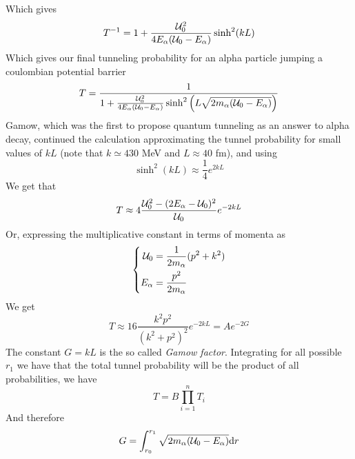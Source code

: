 \documentclass[../qm.tex]{subfiles}
\begin{document}
Which gives
\begin{equation*}
	T^{-1}=1+\frac{\mathcal{U}_0^2}{4E_\alpha(\mathcal{U}_0-E_\alpha)}\sinh^2(kL)
\end{equation*}
Which gives our final tunneling probability for an alpha particle jumping a coulombian potential barrier
\begin{equation}
	T=\frac{1}{1+\frac{\mathcal{U}_0^2}{4E_\alpha(\mathcal{U}_0-E_\alpha)}\sinh^2\left(L\sqrt{2m_\alpha(\mathcal{U}_0-E_\alpha)}\right)}
	\label{eq:alphatunnelprob}
\end{equation}
Gamow, which was the first to propose quantum tunneling as an answer to alpha decay, continued the calculation approximating the tunnel probability for small values of $kL$ (note that $k\simeq430$ MeV and $L\approx40$ fm), and using
\begin{equation*}
	\sinh^2(kL)\approx\frac{1}{4}e^{2kL}
\end{equation*}
We get that
\begin{equation*}
	T\approx4\frac{\mathcal{U}_0^2-(2E_\alpha-\mathcal{U}_0)^2}{\mathcal{U}_0}e^{-2kL}
\end{equation*}
Or, expressing the multiplicative constant in terms of momenta as
\begin{equation*}
	\left\{ \begin{aligned}
			\mathcal{U}_0&=\frac{1}{2m_\alpha}(p^2+k^2)\\
			E_\alpha&=\frac{p^2}{2m_\alpha}
	\end{aligned}\right.
\end{equation*}
We get
\begin{equation*}
	T\approx16\frac{k^2p^2}{(k^2+p^2)^2}e^{-2kL}=Ae^{-2G}
\end{equation*}
The constant $G=kL$ is the so called \emph{Gamow factor}. Integrating for all possible $r_1$ we have that the total tunnel probability will be the product of all probabilities, we have
\begin{equation*}
	T=B\prod_{i=1}^nT_i
\end{equation*}
And therefore
\begin{equation}
	G=\int_{r_0}^{r_1}\sqrt{2m_\alpha(\mathcal{U}_0-E_\alpha)}\dd r
	\label{eq:gamowfactorcomp}
\end{equation}
\end{document}
